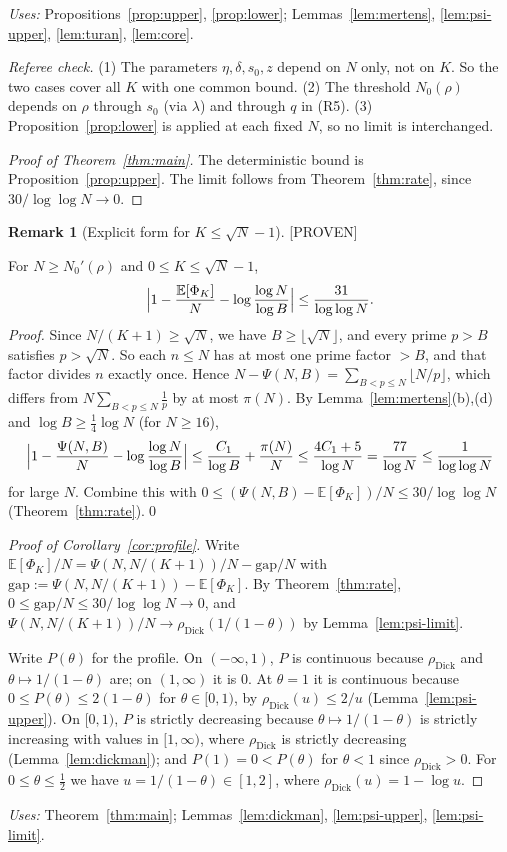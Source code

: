 \documentclass[11pt]{amsart}
\theoremstyle{definition}
\newtheorem{remark}[theorem]{Remark}
\newcommand{\dick}{\rho_{\mathrm{Dick}}}
\newcommand{\E}{\mathbb{E}}
\newcommand{\status}[1]{\textup{\textsf{[#1]}}}
\newcommand{\uses}[1]{\par\smallskip\noindent\textit{Uses:} #1\par\smallskip}
\newcommand{\lean}[1]{\ifhmode\unskip\par\fi{\noindent\footnotesize\raggedright\textup{\textsf{Lean:}}\ \texttt{\detokenize{#1}}\par}}
\begin{document}
\uses{Propositions~\ref{prop:upper}, \ref{prop:lower}; Lemmas~\ref{lem:mertens}, \ref{lem:psi-upper}, \ref{lem:turan}, \ref{lem:core}.}

\noindent\emph{Referee check.} (1) The parameters $\eta,\delta,s_0,z$ depend on $N$ only, not on $K$. So the two cases cover all $K$ with one common bound. (2) The threshold $N_0(\rho)$ depends on $\rho$ through $s_0$ (via $\lambda$) and through $q$ in (R5). (3) Proposition~\ref{prop:lower} is applied at each fixed $N$, so no limit is interchanged.

\begin{proof}[Proof of Theorem~\ref{thm:main}]
The deterministic bound is Proposition~\ref{prop:upper}. The limit follows from Theorem~\ref{thm:rate}, since $30/\log\log N\to0$.
\end{proof}

\begin{remark}[Explicit form for $K\le\sqrt N-1$]\label{rem:smallK}\status{PROVEN}\lean{remark_5_1, smallK_psi, N_sub_psi_eq}
For $N\ge N_0'(\rho)$ and $0\le K\le\sqrt N-1$,
\[
\Bigl|1-\frac{\E[\Phi_K]}N-\log\frac{\log N}{\log B}\Bigr|\le\frac{31}{\log\log N}.
\]
\emph{Proof.} Since $N/(K+1)\ge\sqrt N$, we have $B\ge\lfloor\sqrt N\rfloor$, and every prime $p>B$ satisfies $p>\sqrt N$. So each $n\le N$ has at most one prime factor $>B$, and that factor divides $n$ exactly once. Hence $N-\Psi(N,B)=\sum_{B<p\le N}\lfloor N/p\rfloor$, which differs from $N\sum_{B<p\le N}\frac1p$ by at most $\pi(N)$. By Lemma~\ref{lem:mertens}(b),(d) and $\log B\ge\frac14\log N$ (for $N\ge16$),
\[
\Bigl|1-\frac{\Psi(N,B)}N-\log\frac{\log N}{\log B}\Bigr|\le\frac{C_1}{\log B}+\frac{\pi(N)}N\le\frac{4C_1+5}{\log N}=\frac{77}{\log N}\le\frac1{\log\log N}
\]
for large $N$. Combine this with $0\le(\Psi(N,B)-\E[\Phi_K])/N\le30/\log\log N$ (Theorem~\ref{thm:rate}).\qed
\end{remark}

\begin{proof}[Proof of Corollary~\ref{cor:profile}]
Write $\E[\Phi_K]/N=\Psi(N,N/(K+1))/N-\mathrm{gap}/N$ with $\mathrm{gap}:=\Psi(N,N/(K+1))-\E[\Phi_K]$. By Theorem~\ref{thm:rate}, $0\le\mathrm{gap}/N\le30/\log\log N\to0$, and $\Psi(N,N/(K+1))/N\to\dick(1/(1-\theta))$ by Lemma~\ref{lem:psi-limit}.

Write $P(\theta)$ for the profile. On $(-\infty,1)$, $P$ is continuous because $\dick$ and $\theta\mapsto1/(1-\theta)$ are; on $(1,\infty)$ it is $0$. At $\theta=1$ it is continuous because $0\le P(\theta)\le2(1-\theta)$ for $\theta\in[0,1)$, by $\dick(u)\le2/u$ (Lemma~\ref{lem:psi-upper}). On $[0,1)$, $P$ is strictly decreasing because $\theta\mapsto1/(1-\theta)$ is strictly increasing with values in $[1,\infty)$, where $\dick$ is strictly decreasing (Lemma~\ref{lem:dickman}); and $P(1)=0<P(\theta)$ for $\theta<1$ since $\dick>0$. For $0\le\theta\le\frac12$ we have $u=1/(1-\theta)\in[1,2]$, where $\dick(u)=1-\log u$.
\end{proof}
\uses{Theorem~\ref{thm:main}; Lemmas~\ref{lem:dickman}, \ref{lem:psi-upper}, \ref{lem:psi-limit}.}
\end{document}

